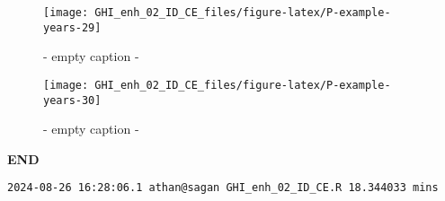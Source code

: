 \documentclass[
  10pt,
  a4paper,oneside]{article}
\begin{document}
\begin{figure}[H]

{\centering \texttt{[image: GHI\_enh\_02\_ID\_CE\_files/figure-latex/P-example-years-29]} 

}

\caption{ - empty caption - }\label{fig:P-example-years-29}
\end{figure}
\begin{figure}[H]

{\centering \texttt{[image: GHI\_enh\_02\_ID\_CE\_files/figure-latex/P-example-years-30]} 

}

\caption{ - empty caption - }\label{fig:P-example-years-30}
\end{figure}

\textbf{END}

\begin{verbatim}
2024-08-26 16:28:06.1 athan@sagan GHI_enh_02_ID_CE.R 18.344033 mins
\end{verbatim}
\end{document}
